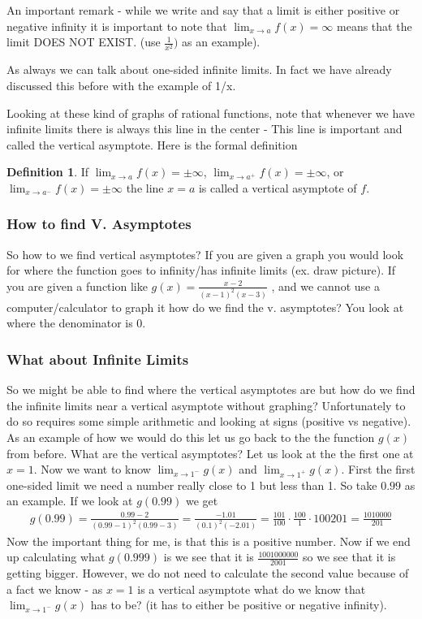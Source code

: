 \documentclass[12pt,reqno]{article}
\theoremstyle{definition}
\newtheorem*{Definition}{Definition}
\begin{document}
	An important remark - while we write and say that a limit is either positive or negative infinity it is important to note that $\lim_{x \to a} f(x) = \infty$ means that the limit DOES NOT EXIST.  (use $\frac{1}{x^2})$ as an example). 
	
	As always we can talk about one-sided infinite limits. In fact we have already discussed this before with the example of 1/x. 
	
	Looking at these kind of graphs of rational functions, note that whenever we have infinite limits there is always this line in the center - This line is important and called the vertical asymptote. Here is the formal definition
	
	\begin{Definition}
		If $\lim_{x \to a} f(x) = \pm \infty$, $\lim_{x\to a^+} f(x) = \pm \infty$, or $\lim_{x \to a^-} f(x)  = \pm \infty$ the line $x  = a$ is called a vertical asymptote of $f$.
	\end{Definition}

	\subsubsection{How to find V. Asymptotes}
	
	So how to we find vertical asymptotes? If you are given a graph you would look for where the function goes to infinity/has infinite limits (ex. draw picture). If you are given a function like $g(x) = \frac{x - 2}{(x - 1)^2 (x - 3)}$ , and we cannot use a computer/calculator to graph it how do we find the v. asymptotes? You look at where the denominator is 0. 
	
	\subsubsection{What about Infinite Limits}
	So we might be able to find where the vertical asymptotes are but how do we find the infinite limits near a vertical asymptote without graphing? Unfortunately to do so requires some simple arithmetic and looking at signs (positive vs negative). As an example of how we would do this let us go back to the the function $g(x)$ from before. What are the vertical asymptotes? Let us look at the the first one at $x = 1$. Now we want to know $\lim_{x \to 1^-} g(x)$ and $\lim_{x \to 1^+} g(x)$. First the first one-sided limit we need a number really close to 1 but less than 1. So take $0.99$ as an example. If we look at $g(0.99)$ we get 
	\begin{align*}
		g(0.99) = \frac{0.99 - 2}{(0.99 - 1)^2 (0.99 - 3)} = \frac{-1.01}{(0.1)^2 (-2.01)} = \frac{101}{100} \cdot \frac{100}{1} \cdot {100}{201} = \frac{1010000}{201}
	\end{align*}
	Now the important thing for me, is that this is a positive number. Now if we end up calculating what $g(0.999)$ is we see that it is $\frac{1001000000}{2001}$ so we see that it is getting bigger. However, we do not need to calculate the second value because of a fact we know - as $x = 1$ is a vertical asymptote what do we know that $\lim_{x\to 1^-} g(x)$ has to be? (it has to either be positive or negative infinity). 
	
\end{document}

